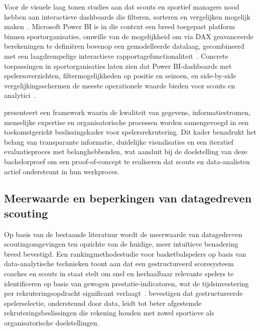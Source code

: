 Voor de visuele laag tonen studies aan dat scouts en sportief managers nood hebben
aan interactieve dashboards die filteren, sorteren en vergelijken mogelijk
maken~\autocite{demenius2017benefits}. Microsoft Power BI is in die context een
breed toegepast platform binnen sportorganisaties, omwille van de mogelijkheid om
via DAX geavanceerde berekeningen te definiëren bovenop een gemodelleerde
datalaag, gecombineerd met een laagdrempelige interactieve
rapportagefunctionaliteit~\autocite{Forouhandeh2025}. Concrete toepassingen in
sportorganisaties laten zien dat Power BI-dashboards met spelersoverzichten,
filtermogelijkheden op positie en seizoen, en side-by-side vergelijkingsschermen de
meeste operationele waarde bieden voor scouts en analytici~\autocite{Forouhandeh2025}.

\textcite{iglesiasdata} presenteert een framework waarin de kwaliteit van gegevens,
informatiestromen, menselijke expertise en organisatorische processen worden
samengevoegd in een toekomstgericht beslissingskader voor spelersrekrutering. Dit
kader benadrukt het belang van transparante informatie, duidelijke visualisaties en
een iteratief evaluatieproces met belanghebbenden, wat aansluit bij de doelstelling
van deze bachelorproef om een proof-of-concept te realiseren dat scouts en
data-analisten actief ondersteunt in hun werkproces.

\subsection{Meerwaarde en beperkingen van datagedreven scouting}%
\label{subsec:meerwaarde-beperkingen}

Op basis van de bestaande literatuur wordt de meerwaarde van datagedreven
scoutingomgevingen ten opzichte van de huidige, meer intuïtieve benadering breed
bevestigd. Een rankingmethodestudie voor basketbalspelers op basis van
data-analytische technieken toont aan dat een gestructureerd scoresysteem coaches
en scouts in staat stelt om snel en herhaalbaar relevante spelers te identificeren op
basis van gewogen prestatie-indicatoren, wat de tijdsinvestering per
rekruteringsopdracht significant verlaagt~\autocite{Vadruccio2018}.
\textcite{banucha2025strategic} bevestigen dat gestructureerde spelerselectie,
ondersteund door data, leidt tot beter afgestemde rekruteringsbeslissingen die
rekening houden met zowel sportieve als organisatorische doelstellingen.

